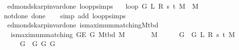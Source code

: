 \begin{isabellebody}
%
\isadelimproof
\isanewline
%
\endisadelimproof
%
\isadeliminvisible
\isanewline
%
\endisadeliminvisible
%
\isataginvisible
{}\isamarkupfalse%
\ {\isacharparenleft}{\kern0pt}\ edmonds{\isacharunderscore}{\kern0pt}karp{\isacharunderscore}{\kern0pt}invar{\isacharunderscore}{\kern0pt}done{\isacharunderscore}{\kern0pt}{}{\isacharparenright}{\kern0pt}\ loop{\isacharprime}{\kern0pt}{\isacharunderscore}{\kern0pt}psimps{\isacharcolon}{\kern0pt}\isanewline
\ \ \ {\isachardoublequoteopen}loop{\isacharprime}{\kern0pt}\ G\ L\ R\ s\ t\ M\ {\isacharequal}{\kern0pt}\ M{\isachardoublequoteclose}%
\endisataginvisible
{\isafoldinvisible}%
%
\isadeliminvisible
\isanewline
%
\endisadeliminvisible
%
\isadelimproof
\ \ %
\endisadelimproof
%
\isatagproof
{}\isamarkupfalse%
\ not{\isacharunderscore}{\kern0pt}done{\isacharunderscore}{\kern0pt}{}\ done{\isacharunderscore}{\kern0pt}{}\isanewline
\ \ \isamarkupfalse%
\ {\isacharparenleft}{\kern0pt}simp\ add{\isacharcolon}{\kern0pt}\ loop{\isacharprime}{\kern0pt}{\isacharunderscore}{\kern0pt}psimps{\isacharparenright}{\kern0pt}%
\endisatagproof
{\isafoldproof}%
%
\isadelimproof
\isanewline
%
\endisadelimproof
\isanewline
{}\isamarkupfalse%
\ {\isacharparenleft}{\kern0pt}\ edmonds{\isacharunderscore}{\kern0pt}karp{\isacharunderscore}{\kern0pt}invar{\isacharunderscore}{\kern0pt}done{\isacharunderscore}{\kern0pt}{}{\isacharparenright}{\kern0pt}\ is{\isacharunderscore}{\kern0pt}maximum{\isacharunderscore}{\kern0pt}matching{\isacharunderscore}{\kern0pt}M{\isacharunderscore}{\kern0pt}tbd{\isacharcolon}{\kern0pt}\isanewline
\ \ \ {\isachardoublequoteopen}is{\isacharunderscore}{\kern0pt}maximum{\isacharunderscore}{\kern0pt}matching\ {\isacharparenleft}{\kern0pt}G{\isachardot}{\kern0pt}E\ G{\isacharparenright}{\kern0pt}\ {\isacharparenleft}{\kern0pt}M{\isacharunderscore}{\kern0pt}tbd\ M{\isacharparenright}{\kern0pt}{\isachardoublequoteclose}\isanewline
%
\isadelimproof
%
\endisadelimproof
%
\isatagproof
{}\isamarkupfalse%
\ {\isacharminus}{\kern0pt}\isanewline
\ \ \isacommand{{\isacharbraceleft}{\kern0pt}}\isamarkupfalse%
\ \isamarkupfalse%
\ M{\isacharprime}{\kern0pt}\isanewline
\ \ \ \ \isamarkupfalse%
\ {\isacharquery}{\kern0pt}G{}\ {\isacharequal}{\kern0pt}\ {\isachardoublequoteopen}G{}\ L\ R\ s\ t\ M{\isachardoublequoteclose}\isanewline
\ \ \ \ \isamarkupfalse%
\ {\isacharquery}{\kern0pt}G{}\ {\isacharequal}{\kern0pt}\ {\isachardoublequoteopen}G{}\ G\ {\isacharquery}{\kern0pt}G{}{\isachardoublequoteclose}\isanewline

\end{isabellebody}
